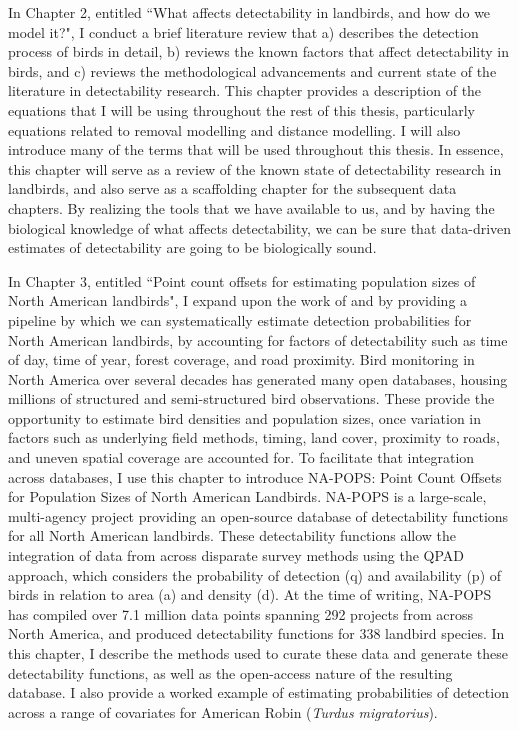 \par In Chapter 2, entitled ``What affects detectability in landbirds, and how do we model it?", I conduct a brief literature review that a) describes the detection process of birds in detail, b) reviews the known factors that affect detectability in birds, and c) reviews the methodological advancements and current state of the literature in detectability research.
This chapter provides a description of the equations that I will be using throughout the rest of this thesis, particularly equations related to removal modelling and distance modelling.
I will also introduce many of the terms that will be used throughout this thesis.
In essence, this chapter will serve as a review of the known state of detectability research in landbirds, and also serve as a scaffolding chapter for the subsequent data chapters.
By realizing the tools that we have available to us, and by having the biological knowledge of what affects detectability, we can be sure that data-driven estimates of detectability are going to be biologically sound.


\par In Chapter 3, entitled ``Point count offsets for estimating population sizes of North American landbirds", I expand upon the work of \citet{solymos_calibrating_2013} and \citet{solymos_evaluating_2018} by providing a pipeline by which we can systematically estimate detection probabilities for North American landbirds, by accounting for factors of detectability such as time of day, time of year, forest coverage, and road proximity.
Bird monitoring in North America over several decades has generated many open databases, housing millions of structured and semi-structured bird observations. 
These provide the opportunity to estimate bird densities and population sizes, once variation in factors such as underlying field methods, timing, land cover, proximity to roads, and uneven spatial coverage are accounted for. 
To facilitate that integration across databases, I use this chapter to introduce NA-POPS: Point Count Offsets for Population Sizes of North American Landbirds. 
NA-POPS is a large-scale, multi-agency project providing an open-source database of detectability functions for all North American landbirds. 
These detectability functions allow the integration of data from across disparate survey methods using the QPAD approach, which considers the probability of detection (q) and availability (p) of birds in relation to area (a) and density (d). 
At the time of writing, NA-POPS has compiled over 7.1 million data points spanning 292 projects from across North America, and produced detectability functions for 338 landbird species. 
In this chapter, I describe the methods used to curate these data and generate these detectability functions, as well as the open-access nature of the resulting database. 
I also provide a worked example of estimating probabilities of detection across a range of covariates for American Robin (\textit{Turdus migratorius}).


